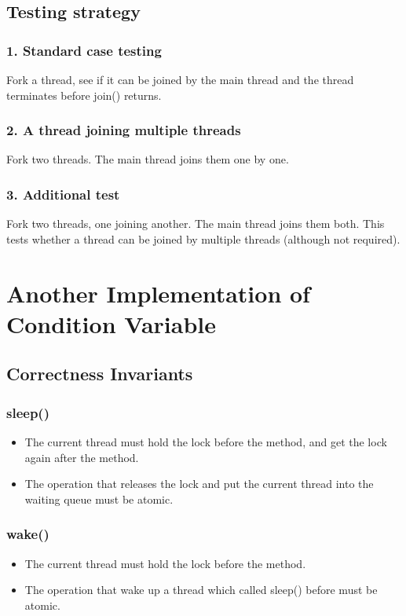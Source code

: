 \documentclass{article}
\begin{document}
	
	\subsection{Testing strategy}
	
	\subsubsection*{1. Standard case testing}
	Fork a thread, see if it can be joined by the main thread and the thread terminates before join() returns.
	
	\subsubsection*{2. A thread joining multiple threads}
	Fork two threads. The main thread joins them one by one.
	
	\subsubsection*{3. Additional test}
	Fork two threads, one joining another. The main thread joins them both. This tests whether a thread can be joined by multiple threads (although not required).
		
	\section{Another Implementation of Condition Variable}
	
	\subsection{Correctness Invariants}
	
	\subsubsection*{sleep()}
	\begin{itemize}
		\item The current thread must hold the lock before the method, and get the lock again after the method.
		
		\item The operation that releases the lock and put the current thread into the waiting queue  must be atomic.
	\end{itemize}
	
	\subsubsection*{wake()}
	\begin{itemize}
		\item The current thread must hold the lock before the method.
			
		\item The operation that wake up a thread which called sleep() before must be atomic.
	\end{itemize}
	
\end{document}
